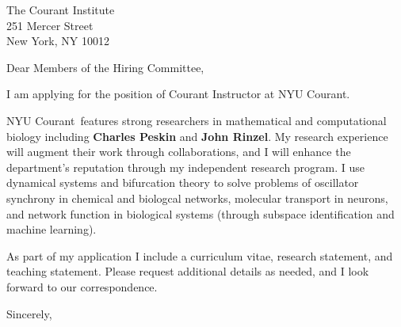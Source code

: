 \documentclass[11pt,a4paper]{letter}
\begin{document}
\def\School{NYU Courant}
\begin{letter}
{The Courant Institute\\
251 Mercer Street\\
New York, NY 10012}


\opening{Dear Members of the Hiring Committee,}

I am applying for the position of Courant Instructor at \School. 



\School~features strong researchers in mathematical and computational biology including \textbf{Charles Peskin} and \textbf{John Rinzel}. My research experience will augment their work through collaborations, and I will enhance the department's reputation through my independent research program. I use dynamical systems and bifurcation theory to solve problems of oscillator synchrony in chemical and biologcal networks, molecular transport in neurons, and network function in biological systems (through subspace identification and machine learning).



As part of my application I include a curriculum vitae, research statement, and teaching statement. Please request additional details as needed, and I look forward to our correspondence.

\closing{Sincerely,}
\end{letter}
\end{document}
